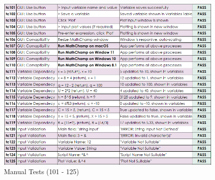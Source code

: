 \documentclass[a4paper, oneside, 11pt]{report}
\begin{document}
\begin{figure}[H]
    \centering
    \includegraphics[width=16.0cm]{MathChampTestPlan-E.png}
    \caption{Manual Tests (101 - 125)}
    \label{fig:tests76 - 100}
\end{figure}
\newpage
\end{document}
